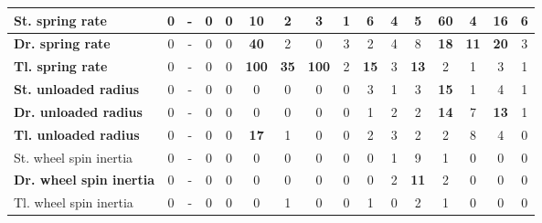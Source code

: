\begin{table}[H]
\begin{tabular}{|l|c|c|c|c|c|c|c|c|c|c|c|c|c|c|c|}
\hline
\textcolor[rgb]{0.000, 0.447, 0.698}{\textbf{St. spring rate}} & 0 & - & 0 & 0 & \textbf{10} & 2 & 3 & 1 & 6 & 4 & 5 & \textcolor[rgb]{0.000, 0.447, 0.698}{\textbf{60}} & 4 & \textbf{16} & 6 \\
\hline
\textcolor[rgb]{0.000, 0.620, 0.451}{\textbf{Dr. spring rate}} & 0 & - & 0 & 0 & \textcolor[rgb]{0.000, 0.620, 0.451}{\textbf{40}} & 2 & 0 & 3 & 2 & 4 & 8 & \textbf{18} & \textbf{11} & \textbf{20} & 3 \\
\hline
\textcolor[rgb]{0.851, 0.373, 0.008}{\textbf{Tl. spring rate}} & 0 & - & 0 & 0 & \textcolor[rgb]{0.835, 0.369, 0.000}{\textbf{100}} & \textcolor[rgb]{0.000, 0.620, 0.451}{\textbf{35}} & \textcolor[rgb]{0.835, 0.369, 0.000}{\textbf{100}} & 2 & \textbf{15} & 3 & \textbf{13} & 2 & 1 & 3 & 1 \\
\hline
\textbf{St. unloaded radius} & 0 & - & 0 & 0 & 0 & 0 & 0 & 0 & 3 & 1 & 3 & \textbf{15} & 1 & 4 & 1 \\
\hline
\textbf{Dr. unloaded radius} & 0 & - & 0 & 0 & 0 & 0 & 0 & 0 & 1 & 2 & 2 & \textbf{14} & 7 & \textbf{13} & 1 \\
\hline
\textbf{Tl. unloaded radius} & 0 & - & 0 & 0 & \textbf{17} & 1 & 0 & 0 & 2 & 3 & 2 & 2 & 8 & 4 & 0 \\
\hline
St. wheel spin inertia & 0 & - & 0 & 0 & 0 & 0 & 0 & 0 & 0 & 1 & 9 & 1 & 0 & 0 & 0 \\
\hline
\textbf{Dr. wheel spin inertia} & 0 & - & 0 & 0 & 0 & 0 & 0 & 0 & 0 & 2 & \textbf{11} & 2 & 0 & 0 & 0 \\
\hline
Tl. wheel spin inertia & 0 & - & 0 & 0 & 0 & 1 & 0 & 0 & 1 & 0 & 2 & 1 & 0 & 0 & 0 \\
\hline

\end{tabular}%
\end{table}%



